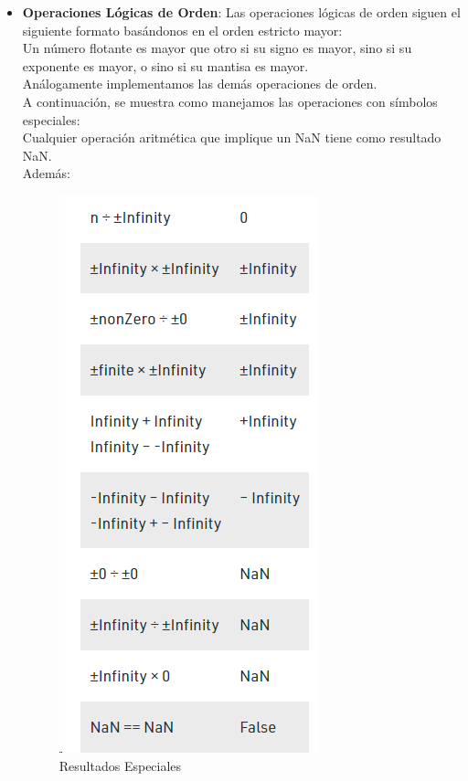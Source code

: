 \documentclass[a4paper,10pt,twocolumn]{article}
\begin{document}
\begin{itemize}
		\item \textbf{Operaciones Lógicas de Orden}:
		Las operaciones lógicas de orden siguen el siguiente formato basándonos en el orden estricto mayor:\\
		
		Un número flotante es mayor que otro si su signo es mayor, sino si su exponente es mayor, o sino si su mantisa es     mayor.\\
		Análogamente implementamos las demás operaciones de orden.\\
		A continuación, se muestra como manejamos las operaciones con símbolos especiales: \\
		Cualquier operación aritmética que implique un NaN tiene como resultado NaN.\\
		Además:
		\begin{figure}[H]
			\centering
			\includegraphics[width=0.7\linewidth]{res/screenshot002}
			\caption{Resultados Especiales}
			\label{}
		\end{figure}
		
	\end{itemize}
	
\end{document}
